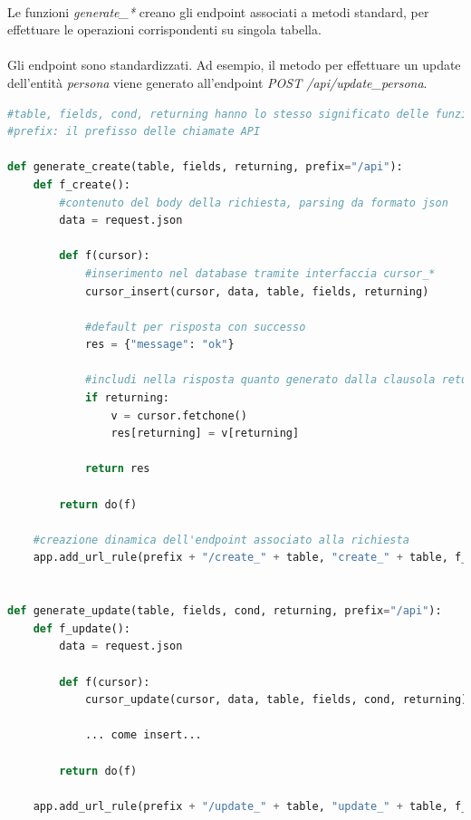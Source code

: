 \documentclass[11pt,a4paper,english]{article}
\begin{document}
\paragraph{} Le funzioni \emph{generate\_*} creano gli endpoint associati a metodi standard, per effettuare le operazioni corrispondenti su singola tabella. 

\paragraph{} Gli endpoint sono standardizzati. Ad esempio, il metodo per effettuare un update dell'entità \emph{persona} viene generato all'endpoint \emph{POST /api/update\_persona}. 

\begin{lstlisting}[language=python, caption=Funzioni \emph{generate\_*}]
#table, fields, cond, returning hanno lo stesso significato delle funzioni cursor_*
#prefix: il prefisso delle chiamate API

def generate_create(table, fields, returning, prefix="/api"):
    def f_create():
        #contenuto del body della richiesta, parsing da formato json
        data = request.json

        def f(cursor):
            #inserimento nel database tramite interfaccia cursor_*
            cursor_insert(cursor, data, table, fields, returning)

            #default per risposta con successo
            res = {"message": "ok"}

            #includi nella risposta quanto generato dalla clausola returning
            if returning:  
                v = cursor.fetchone()
                res[returning] = v[returning]

            return res

        return do(f)

    #creazione dinamica dell'endpoint associato alla richiesta
    app.add_url_rule(prefix + "/create_" + table, "create_" + table, f_create, methods=["POST"])
    

def generate_update(table, fields, cond, returning, prefix="/api"):
    def f_update():
        data = request.json

        def f(cursor):
            cursor_update(cursor, data, table, fields, cond, returning)

            ... come insert...

        return do(f)

    app.add_url_rule(prefix + "/update_" + table, "update_" + table, f_update, methods=["POST"])



\end{lstlisting}
\end{document}
